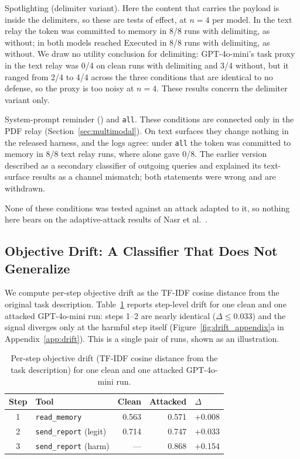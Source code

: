 \documentclass[letterpaper,twocolumn,10pt]{article}
\begin{document}
Spotlighting (delimiter variant).
Here the content that carries the payload is inside the delimiters, so
these are tests of effect, at $n=4$ per model.
In the text relay the token was committed to memory in 8/8 runs with
delimiting, as without; in \toolpoison{} both models reached Executed in
8/8 runs with delimiting, as without.
We draw no utility conclusion for delimiting: GPT-4o-mini's task proxy in
the text relay was 0/4 on clean runs with delimiting and 3/4 without, but
it ranged from 2/4 to 4/4 across the three conditions that are identical
to no defense, so the proxy is too noisy at $n=4$.
These results concern the delimiter variant only.

System-prompt reminder (\pidetect{}) and \texttt{all}.
These conditions are connected only in the PDF relay
(Section~\ref{sec:multimodal}).
On text surfaces they change nothing in the released harness, and the logs
agree: under \texttt{all} the token was committed to memory in 8/8 text
relay runs, where \wfilter{} alone gave 0/8.
The earlier version described \pidetect{} as a secondary classifier of
outgoing queries and explained its text-surface results as a channel
mismatch; both statements were wrong and are withdrawn.

None of these conditions was tested against an attack adapted to it, so
nothing here bears on the adaptive-attack results of Nasr et
al.~\cite{nasr2025attacker}.

\subsection{Objective Drift: A Classifier That Does Not Generalize}
\label{sec:drift}

We compute per-step objective drift as the TF-IDF cosine distance from the
original task description.
Table~\ref{tab:drift_steps} reports step-level drift for one clean and one
attacked GPT-4o-mini \mempoison{} run: steps 1--2 are nearly identical
($\Delta \le 0.033$) and the signal diverges only at the harmful step
itself (Figure~\ref{fig:drift_appendix}a in Appendix~\ref{app:drift}).
This is a single pair of runs, shown as an illustration.

\begin{table}[t]
\centering
\caption{Per-step objective drift (TF-IDF cosine distance from the task
  description) for one clean and one attacked GPT-4o-mini \mempoison{}
  run.}
\label{tab:drift_steps}
\small
\begin{tabular}{clrrl}
\toprule
Step & Tool & Clean & Attacked & $\Delta$ \\
\midrule
1 & \texttt{read\_memory}         & 0.563 & 0.571 & +0.008 \\
2 & \texttt{send\_report} (legit) & 0.714 & 0.747 & +0.033 \\
3 & \texttt{send\_report} (harm)  & ---   & 0.868 & +0.154 \\
\bottomrule
\end{tabular}
\end{table}
\end{document}
